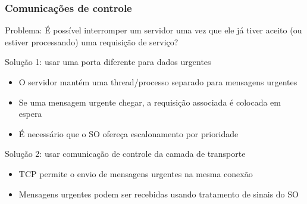\documentclass[Ligatures=TeX,table,brazil,svgnames,usetotalslideindicator,compress,10pt]{beamer}
\begin{document}
\begin{frame}
  \frametitle{Comunicações de controle}
  \begin{block}{Problema:}
    É possível \alert{interromper} um servidor uma vez que ele já tiver aceito (ou estiver processando) uma requisição de serviço?
  \end{block}

  \small
  \begin{block}{Solução 1: usar uma porta diferente para dados urgentes}

    \begin{itemize}
    \item O servidor mantém uma thread/processo separado para mensagens urgentes
    \item Se uma mensagem urgente chegar, a requisição associada é colocada em espera
    \item É necessário que o SO ofereça escalonamento por prioridade
    \end{itemize}
  \end{block}

  \pause

  \begin{block}{Solução 2: usar comunicação de controle da camada de transporte}
    \begin{itemize}
    \item TCP permite o envio de mensagens urgentes na mesma conexão
    \item Mensagens urgentes podem ser recebidas usando tratamento de sinais do SO
    \end{itemize}
  \end{block}

\end{frame}
\end{document}
